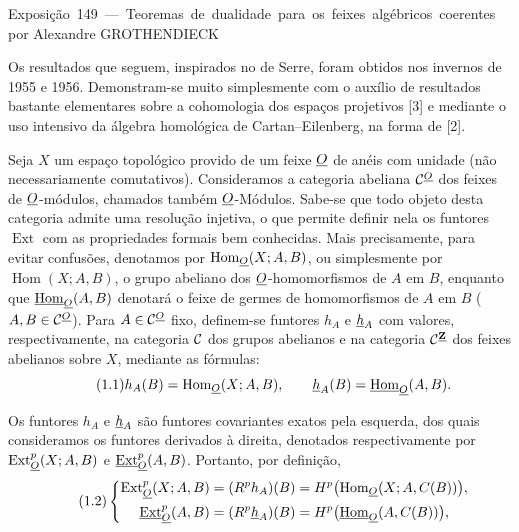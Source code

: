 \unit{Exposição 149 — Teoremas de dualidade para os feixes algébricos coerentes}
%
  {por Alexandre GROTHENDIECK}

Os resultados que seguem, inspirados no 
de Serre, foram obtidos nos invernos de 1955 e 1956. Demonstram-se muito
simplesmente com o auxílio de resultados bastante elementares sobre a cohomologia dos espaços
projetivos [3] e mediante o uso intensivo da álgebra homológica de
Cartan--Eilenberg, na forma de [2].


Seja $X$ um espaço topológico provido de um feixe $\underline{O}$ de anéis com unidade
(não necessariamente comutativos). Consideramos a categoria abeliana
$\mathcal C^{\underline{O}}$ dos feixes de $\underline{O}$-módulos, chamados também $\underline{O}$-Módulos.
Sabe-se que todo objeto desta categoria admite uma resolução injetiva, o que
permite definir nela os funtores $\operatorname{Ext}$ com as propriedades
formais bem conhecidas. Mais precisamente, para evitar confusões,
denotamos por $\operatorname{Hom}_{\underline{O}}(X;A,B)$, ou simplesmente por
$\operatorname{Hom}(X;A,B)$, o grupo abeliano dos $\underline{O}$-homomorfismos de $A$
em $B$, enquanto que $\underline{\operatorname{Hom}}_{\underline{O}}(A,B)$ denotará o feixe de germes
de homomorfismos de $A$ em $B$ ($A,B\in\mathcal C^{\underline{O}}$). Para
$A\in\mathcal C^{\underline{O}}$ fixo, definem-se funtores $h_A$ e $\underline{h}_A$ com valores, respectivamente,
na categoria $\mathcal C$ dos grupos abelianos e na categoria
$\mathcal C^{\underline{\mathbf Z}}$ dos feixes abelianos sobre $X$, mediante as fórmulas:
\begin{equation}\tag{1.1}
  h_A(B)=\operatorname{Hom}_{\underline{O}}(X;A,B),
  \qquad
  \underline{h}_A(B)=\underline{\operatorname{Hom}}_{\underline{O}}(A,B).
\end{equation}

Os funtores $h_A$ e $\underline{h}_A$ são funtores covariantes exatos pela esquerda,
dos quais consideramos os funtores derivados à direita, denotados respectivamente por
$\operatorname{Ext}_{\underline{O}}^{p}(X;A,B)$ e $\underline{\operatorname{Ext}}_{\underline{O}}^{p}(A,B)$. Portanto,
por definição,
\begin{equation}\tag{1.2}
\left\{
\begin{aligned}
\operatorname{Ext}_{\underline{O}}^{p}(X;A,B)
  &= (R^{p}h_A)(B)
   = H^{p}\bigl(\operatorname{Hom}_{\underline{O}}(X;A,C(B))\bigr),\\
\underline{\operatorname{Ext}}_{\underline{O}}^{p}(A,B)
  &= (R^{p}\underline{h}_A)(B)
   = H^{p}\bigl(\underline{\operatorname{Hom}}_{\underline{O}}(A,C(B))\bigr),
\end{aligned}
\right.
\end{equation}

